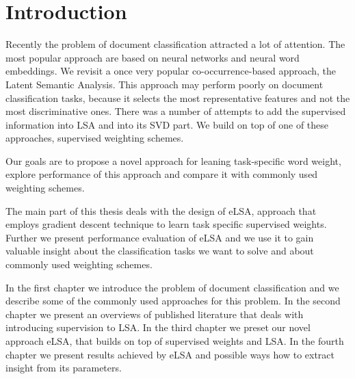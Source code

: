 \chapter*{Introduction}

Recently the problem of document classification attracted a lot of attention. 
The most popular approach are based on neural networks and neural word embeddings.
We revisit a once very popular co-occurrence-based approach, the Latent Semantic Analysis.
This approach may perform poorly on document classification tasks, because it selects the most representative features and not the most discriminative ones. 
There was a number of attempts to add the supervised information into LSA and into its SVD part.
We build on top of one of these approaches, supervised weighting schemes.

\bigskip
Our goals are to propose a novel approach for leaning task-specific word weight, explore performance of this approach and compare it with commonly used weighting schemes.
\bigskip

The main part of this thesis deals with the design of eLSA, approach that employs gradient descent technique to learn task specific supervised weights.
Further we present performance evaluation of eLSA and we use it to gain valuable insight about the classification tasks we want to solve and about commonly used weighting schemes.

\bigskip

In the first chapter we introduce the problem of document classification and we describe some of the commonly used approaches for this problem.
In the second chapter we present an overviews of published literature that deals with introducing supervision to LSA.
In the third chapter we preset our novel approach eLSA, that builds on top of supervised weights and LSA.
In the fourth chapter we present results achieved by eLSA and possible ways how to extract insight from its parameters. 



